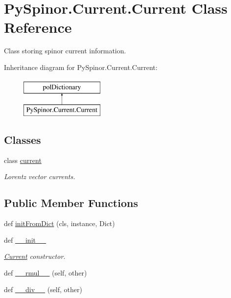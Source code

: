 \hypertarget{class_py_spinor_1_1_current_1_1_current}{}\section{Py\+Spinor.\+Current.\+Current Class Reference}
\label{class_py_spinor_1_1_current_1_1_current}


Class storing spinor current information.  


Inheritance diagram for Py\+Spinor.\+Current.\+Current\+:\begin{figure}[H]
\begin{center}
\leavevmode
\includegraphics[height=2.000000cm]{class_py_spinor_1_1_current_1_1_current}
\end{center}
\end{figure}
\subsection*{Classes}
\begin{DoxyCompactItemize}
\item 
class \hyperlink{class_py_spinor_1_1_current_1_1_current_1_1current}{current}
\begin{DoxyCompactList}\small\item\em Lorentz vector currents. \end{DoxyCompactList}\end{DoxyCompactItemize}
\subsection*{Public Member Functions}
\begin{DoxyCompactItemize}
\item 
def \hyperlink{class_py_spinor_1_1_current_1_1_current_a5a4c380b36f9757b46a434a4c42ea3ed}{init\+From\+Dict} (cls, instance, Dict)
\item 
def \hyperlink{class_py_spinor_1_1_current_1_1_current_a6f8c8e4850fda84bc354636c2c47f57a}{\+\_\+\+\_\+init\+\_\+\+\_\+}
\begin{DoxyCompactList}\small\item\em \hyperlink{class_py_spinor_1_1_current_1_1_current}{Current} constructor. \end{DoxyCompactList}\item 
def \hyperlink{class_py_spinor_1_1_current_1_1_current_a8d0a4648405116998091d1e1de6a6b58}{\+\_\+\+\_\+rmul\+\_\+\+\_\+} (self, other)
\item 
def \hyperlink{class_py_spinor_1_1_current_1_1_current_ac24728ae3294273b179751ee920df9c8}{\+\_\+\+\_\+div\+\_\+\+\_\+} (self, other)
\end{DoxyCompactItemize}
